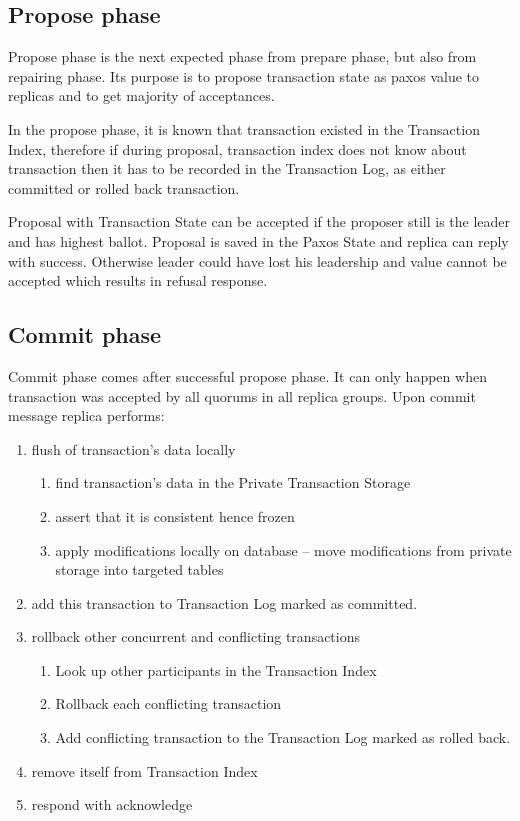 \subsection{Propose phase}
Propose phase is the next expected phase from prepare phase, but also from repairing phase. Its purpose is to propose transaction state as paxos value to replicas and to get majority of acceptances. 

In the propose phase, it is known that transaction existed in the Transaction Index, therefore if during proposal,  transaction index does not know about transaction then it has to be recorded in the Transaction Log, as either committed or rolled back transaction.

Proposal with Transaction State can be accepted if the proposer still is the leader and has highest ballot. Proposal is saved in the Paxos State and replica can reply with success. Otherwise leader could have lost his leadership and value cannot be accepted which results in refusal response.


\subsection{Commit phase}
Commit phase comes after successful propose phase. It can only happen when transaction was accepted by all quorums in all replica groups. Upon commit message replica performs:
\begin{enumerate}
\item flush of transaction’s data locally
\begin{enumerate}
   \item find transaction’s data in the Private Transaction Storage
   \item assert that it is consistent hence frozen
   \item apply modifications locally on database -- move modifications from private storage into targeted tables
   \end{enumerate}
\item add this transaction to Transaction Log marked as committed.
\item rollback other concurrent and conflicting transactions
 \begin{enumerate}
   \item Look up other participants in the Transaction Index
   \item Rollback each conflicting transaction
   \item Add conflicting transaction to the Transaction Log marked as rolled back.
  \end{enumerate}
\item remove itself from Transaction Index
\item respond with acknowledge
\end{enumerate}

